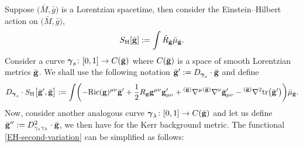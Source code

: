 \documentclass[pdftex]{sigma}
\def\mbo#1{\boldsymbol{#1}}%
\def\grad{{\nabla}}%
\newcommand{\leftexp}[2]{{\vphantom{#2}}^{#1}{#2}}
\def\halb{\frac{1}{2}}%
\renewcommand{\gg}{{\bf g}}
\newcommand{\bgg}{{\bar{\bf g}}}
\newcommand{\la}{\lambda}
\numberwithin{equation}{section}
\begin{document}
Suppose $\bigl(\bar{M}, \bar{g}\bigr)$ is a Lorentzian spacetime, then consider the Einstein--Hilbert action on $\bigl(\bar{M}, \bar{g}\bigr)$,
\begin{align*}
S_{\text{H}}[\bar{\gg}] := \int \bar{R}_{\bar{\gg}} \bar{\mu}_{\bar{\gg}}.
\end{align*}
Consider a curve $\mbo{\gamma}_s \colon [0,1] \to C(\bgg)$ where $C(\bgg)$ is a space of smooth Lorentzian metrics $\bgg$. We shall use the following notation $ \bar{\gg}' := D_{\mbo{\gamma}_s} \cdot \bar{\gg}$ and define
\begin{align*}
D_{\mbo{\gamma}_s} \cdot S_{\text{H}} \bigl[\bgg', \bgg\bigr] := \int \biggl( -\text{Ric}(\gg)^{\mu \nu} \bar{\gg}' + \halb R_\gg \gg^{\mu \nu} \gg'_{\mu \nu} + \leftexp{(\bar{\gg})}{\grad}^\mu \leftexp{(\bar{\gg})}{\grad}^\nu \bar{\gg}'_{\mu \nu} - \leftexp{(\bar{\gg})}{\grad}^2 {\rm tr}\bigl(\bgg'\bigr) \biggr) \bar{\mu}_\bgg.
\end{align*}
Now, consider another analogous curve $\mbo{\gamma}_\la \colon [0, 1] \to C (\bgg)$ and let us define $ \bgg'' := D^2_{\gamma_s \gamma_\lambda} \cdot \bgg $, we then have for the Kerr background metric. The functional \eqref{EH-second-variation} can be simplified as follows:
\end{document}
